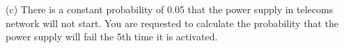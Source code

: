 
(c)	There is a constant probability of 0.05  that the power supply in telecoms network will not start.  You are requested to calculate the probability that the power supply will fail the 5th time it is activated.
